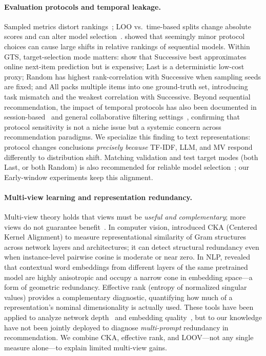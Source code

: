 \documentclass[sigconf,natbib=true,anonymous]{acmart}
\newcommand{\tfidf}{\textsc{TF-IDF}\xspace}
\newcommand{\llm}{\textsc{LLM}\xspace}
\newcommand{\mv}{\textsc{MV}\xspace}
\begin{document}
\paragraph{Evaluation protocols and temporal leakage.}
Sampled metrics distort rankings~\cite{krichene2020sampledmetrics}; LOO vs.\ time-based splits change absolute scores and can alter model selection~\cite{ji2023evaluation,sun2023reevaluation,meng2020temporal}.
\citet{hidasi2018recurrent} showed that seemingly minor protocol choices can cause large shifts in relative rankings of sequential models.
Within GTS, target-selection mode matters: \citet{liang2024timetosplit} show that Successive best approximates online next-item prediction but is expensive; Last is a deterministic low-cost proxy; Random has highest rank-correlation with Successive when sampling seeds are fixed; and All packs multiple items into one ground-truth set, introducing task mismatch and the weakest correlation with Successive.
Beyond sequential recommendation, the impact of temporal protocols has also been documented in session-based~\cite{hidasi2018recurrent} and general collaborative filtering settings~\cite{meng2020temporal}, confirming that protocol sensitivity is not a niche issue but a systemic concern across recommendation paradigms.
We specialize this finding to text representations: protocol changes conclusions \emph{precisely because} \tfidf, \llm, and \mv respond differently to distribution shift.
Matching validation and test target modes (both Last, or both Random) is also recommended for reliable model selection~\cite{liang2024timetosplit}; our Early-window experiments keep this alignment.

\paragraph{Multi-view learning and representation redundancy.}
Multi-view theory holds that views must be \emph{useful and complementary}; more views do not guarantee benefit~\cite{xu2013multiview}.
In computer vision, \citet{kornblith2019cka} introduced CKA (Centered Kernel Alignment) to measure representational similarity of Gram structures across network layers and architectures; it can detect structural redundancy even when instance-level pairwise cosine is moderate or near zero.
In NLP, \citet{ethayarajh2019contextual} revealed that contextual word embeddings from different layers of the same pretrained model are highly anisotropic and occupy a narrow cone in embedding space---a form of geometric redundancy.
Effective rank (entropy of normalized singular values) provides a complementary diagnostic, quantifying how much of a representation's nominal dimensionality is actually used.
These tools have been applied to analyze network depth~\cite{kornblith2019cka} and embedding quality~\cite{ethayarajh2019contextual}, but to our knowledge have not been jointly deployed to diagnose \emph{multi-prompt} redundancy in recommendation.
We combine CKA, effective rank, and LOOV---not any single measure alone---to explain limited multi-view gains.
\end{document}
